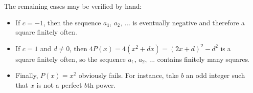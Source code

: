 The remaining cases may be verified by hand:
\begin{itemize}
    \item If $c=-1$, then the sequence $a_1$, $a_2$, $\ldots$ is eventually negative and therefore a square finitely often.
    \item If $c=1$ and $d\ne0$, then $4P(x)=4\left(x^2+dx\right)=(2x+d)^2-d^2$ is a square finitely often, so the sequence $a_1$, $a_2$, $\ldots$ contains finitely many squares.
    \item Finally, $P(x)=x^2$ obviously fails. For instance, take $b$ an odd integer such that $x$ is not a perfect $b$th power.
\end{itemize}


